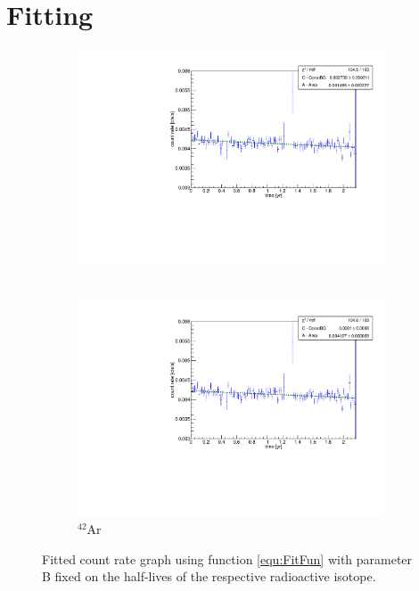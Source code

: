 \documentclass[encoding=utf8,british]{tumphthesis}
\begin{document}
\section{Fitting}
\begin{figure}[t!]
	\centering
	\begin{subfigure}[t]{.475\textwidth}
		\centering
		\includegraphics[width=\textwidth]{./Bilder/eventRateFit.pdf}
		\caption{ \Kr\ }
		\label{fig:eventRateFit}
	\end{subfigure}\hfill%
	\begin{subfigure}[t]{.475\textwidth}
		\centering
		\includegraphics[width=\textwidth]{./Bilder/Argon.pdf}
		\caption{
		$^{42}$Ar
		}
		\label{fig:Argon}
	\end{subfigure}
	\caption{Fitted count rate graph using function \ref{equ:FitFun} with parameter B fixed on the half-lives of the respective radioactive isotope.}
		\label{fig:fit2}
		\vspace{5mm}
\end{figure}
\end{document}

